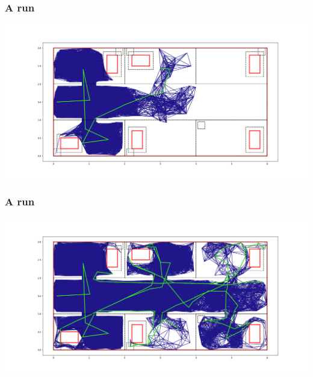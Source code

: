 \documentclass{beamer}
\begin{document}
\begin{frame}
	\frametitle{A run}
	\includegraphics[width=\textwidth]{bin.png}
\end{frame}

\begin{frame}
	\frametitle{A run}
	\includegraphics[width=\textwidth]{final.png}
\end{frame}

	
\end{document}

